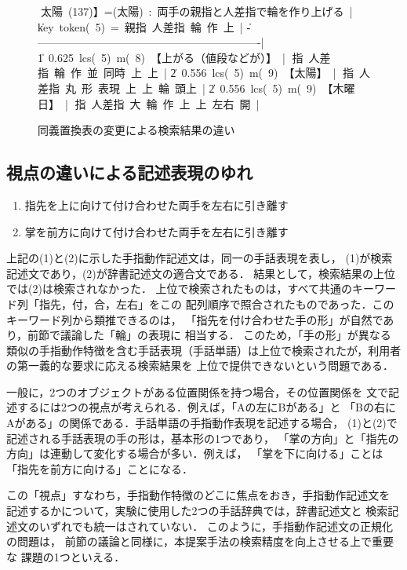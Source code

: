 \begin{figure}[tb]
\vbox{\footnotesize\tabcolsep=3pt
\hbox{\|【太陽 (137)】=(太陽) : 両手の親指と人差指で輪を作り上げる |}
\hbox{\| key token( 5) = 親指 人差指 輪 作 上                         |}
\hbox{\|--------------------------------------------------------------|}
\hbox{\| 1 0.625 lcs( 5) m( 8) 【上がる（値段などが）】 |}
\hbox{\|                        親指 人差指 輪 作 並 同時 上 上 |}
\hbox{\| 2 0.556 lcs( 5) m( 9) 【太陽】                   |}
\hbox{\|                        親指 人差指 丸 形 表現 上 上 輪 頭上 |} 
\hbox{\| 2 0.556 lcs( 5) m( 9) 【木曜日】                   |}
\hbox{\|                        親指 人差指 大 輪 作 上 上 左右 開  |}
}
\centerline{}
\caption{同義置換表の変更による検索結果の違い}
\label{fig:ambiguity3}
\end{figure}

\subsection {視点の違いによる記述表現のゆれ}\label{douitsushi}

\begin{enumerate}
\item 指先を上に向けて付け合わせた両手を左右に引き離す
\item 掌を前方に向けて付け合わせた両手を左右に引き離す
\end{enumerate}

上記の(1)と(2)に示した手指動作記述文は，同一の手話表現を表し，
(1)が検索記述文であり，(2)が辞書記述文の適合文である．
結果として，検索結果の上位では(2)は検索されなかった．
上位で検索されたものは，すべて共通のキーワード列「指先，付，合，左右」をこの
配列順序で照合されたものであった．このキーワード列から類推できるのは，
「指先を付け合わせた手の形」が自然であり，前節で議論した「輪」の表現に
相当する．
このため，「手の形」が異なる類似の手指動作特徴を含む手話表現（手話単語）は上位で検索されたが，利用者の第一義的な要求に応える検索結果を
上位で提供できないという問題である．

一般に，2つのオブジェクトがある位置関係を持つ場合，その位置関係を
文で記述するには2つの視点が考えられる．例えば，「Aの左にBがある」と
「Bの右にAがある」の関係である．手話単語の手指動作表現を記述する場合，
(1)と(2)で記述される手話表現の手の形は，基本形の1つであり，
「掌の方向」と「指先の方向」は連動して変化する場合が多い．例えば，
「掌を下に向ける」ことは「指先を前方に向ける」ことになる．

この「視点」すなわち，手指動作特徴のどこに焦点をおき，手指動作記述文を
記述するかについて，実験に使用した2つの手話辞典では，辞書記述文と
検索記述文のいずれでも統一はされていない．
このように，手指動作記述文の正規化の問題は，
前節の議論と同様に，本提案手法の検索精度を向上させる上で重要な
課題の1つといえる．

